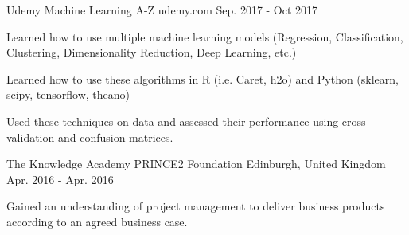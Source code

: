 

\begin{cventries}

  \cventry
  {Udemy}
  {Machine Learning A-Z} %
  {udemy.com} %
  {Sep. 2017 - Oct 2017} %
  {
    \begin{cvitems} %
      \item {Learned how to use multiple machine learning models (Regression, Classification, Clustering, Dimensionality Reduction, Deep Learning, etc.)}
      \item {Learned how to use these algorithms in R (i.e. Caret, h2o) and Python (sklearn, scipy, tensorflow, theano)}
      \item {Used these techniques on data and assessed their performance using cross-validation and confusion matrices.}
    \end{cvitems}
  }

  \cventry
  {The Knowledge Academy} %
  {PRINCE2 Foundation} %
  {Edinburgh, United Kingdom} %
  {Apr. 2016 - Apr. 2016} %
  {
    \begin{cvitems} %
      \item {Gained an understanding of project management to deliver business products according to an agreed business case.}
    \end{cvitems}
  }

\end{cventries}
